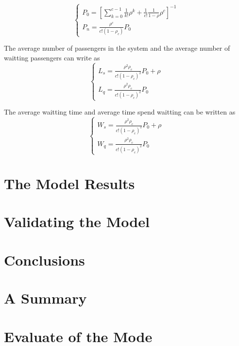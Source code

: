 \documentclass{mcmthesis}
\begin{document}
\begin{equation}    
\left  \{
       \begin{array}{lr}
           P_0=[\sum\limits_{k=0}^{c-1}\frac{1}{k!}\rho ^k+\frac{1}{c!}\frac{1}{1-\rho}\rho ^c]^{-1}\\
            P_n=\frac{\rho ^c}{c!(1-\rho_c)}P_0
        \end{array}
\right.
\end{equation}


The average number of passengers in the system and the average number of waitting passengers can write as
\begin{equation}    
\left  \{
       \begin{array}{lr}
           L_s=\frac{\rho ^2\rho_c}{c!(1-\rho_c)^2}P_0 +\rho \\
          L_q=\frac{\rho ^2\rho_c}{c!(1-\rho_c)^2}P_0 
        \end{array}
\right.
\end{equation}

The average waitting time and average time spend waitting can be written as
\begin{equation}    
\left  \{
       \begin{array}{lr}
           W_s=\frac{\rho ^2\rho_c}{c!(1-\rho_c)^2}P_0 +\rho \\
          W_q=\frac{\rho ^2\rho_c}{c!(1-\rho_c)^2}P_0 
        \end{array}
\right.
\end{equation}



\section{The Model Results}%


\section{Validating the Model}%

\section{Conclusions}%


\section{A Summary}%

\section{Evaluate of the Mode}%
\end{document}
